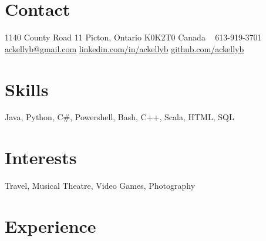 \documentclass[]{friggeri-cv}
\begin{document}



\begin{aside} %
	\section{Contact}
	1140 County Road 11 
	Picton, Ontario
	K0K2T0 Canada
	~
	613-919-3701
	~
	\href{mailto:ackellyb@gmail.com}{ackellyb@gmail.com}
	\href{linkedin.com/in/ackellyb/}{linkedin.com/in/ackellyb}
	\href{https://github.com/ackellyb}{github.com/ackellyb}
	~
	\section{Skills}
	Java, Python, C\#,
	Powershell, Bash, 
	C++, Scala, HTML, SQL
	~
	\section{Interests}
	Travel, Musical Theatre, 
	Video Games, Photography
\end{aside}


\section{Experience}
\end{document}

